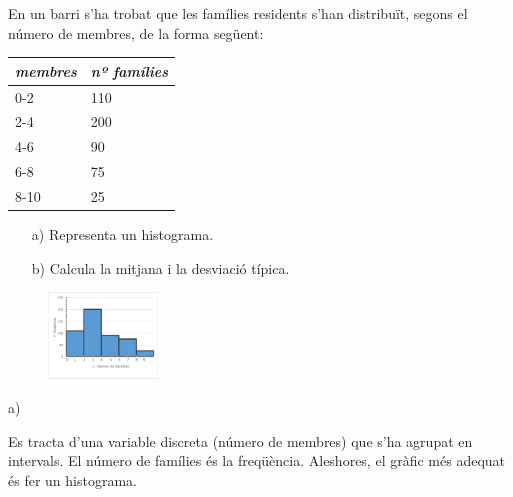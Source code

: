 	
	\begin{resolt}{En un barri s'ha trobat que les famílies residents s'han distribuït, segons el número de membres, de la forma següent:\vspace{0.25cm}
			
			\begin{tabular}{|p{0.7in}|p{0.8in}|} \hline 
				\textbf{\textit{membres}} & \textbf{\textit{nº famílies}} \\ \hline 
				0-2 & 110 \\ \hline 
				2-4 & 200 \\ \hline 
				4-6 & 90 \\ \hline 
				6-8 & 75 \\ \hline 
				8-10 & 25 \\ \hline 
			\end{tabular}
			\vspace{0.25cm}
			
			\begin{itemize}
				\item[a)]  Representa un histograma.
				
				\item[b)]  Calcula la mitjana i la desviació típica.
			\end{itemize}
		}
		
		\begin{figure} 
			\vspace{-0.75cm}
			\begin{center}
				\includegraphics[width=0.26\textwidth]{img-04/histo1}
			\end{center}
			\vspace{-0.5cm}
		\end{figure}
		
		a)
		\vspace{0.24cm}
		
		Es tracta d'una variable discreta (número de membres) que s'ha agrupat en intervals. El número de famílies és la freqüència. Aleshores, el gràfic més adequat és fer un histograma.
		\vspace{0.24cm}
		

\end{resolt}
